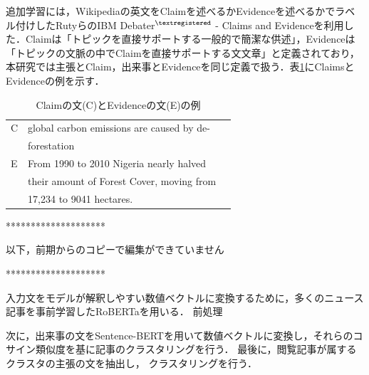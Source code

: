 \documentclass[a4paper, twocolumn, 10pt]{jarticle}
\begin{document}
追加学習には，Wikipediaの英文をClaimを述べるかEvidenceを述べるかでラベル付けしたRutyらのIBM Debater$^{\textregistered}$ - Claims and Evidenceを利用した\cite{rinott_show_2015}．Claimは「トピックを直接サポートする一般的で簡潔な供述」，Evidenceは「トピックの文脈の中でClaimを直接サポートする文文章」と定義されており，本研究では主張とClaim，出来事とEvidenceを同じ定義で扱う．表\ref{claim_evidence_example}にClaimsとEvidenceの例を示す．

\begin{table}[h]
  \caption{Claimの文(C)とEvidenceの文(E)の例}
  \centering
  \begin{tabular}{llp{6cm}}
    \hline
    C & global carbon emissions are caused by de-
    \\
    & forestation
    \\
    E & From 1990 to 2010 Nigeria nearly halved
    \\
    & their amount of Forest Cover, moving from
    \\
    & 17,234 to 9041 hectares.
    \\
    \hline
  \end{tabular}
  \label{claim_evidence_example}
\end{table}

********************

以下，前期からのコピーで編集ができていません

********************


入力文をモデルが解釈しやすい数値ベクトルに変換するために，多くのニュース記事を事前学習したRoBERTaを用いる．
前処理


次に，出来事の文をSentence-BERTを用いて数値ベクトルに変換し，それらのコサイン類似度を基に記事のクラスタリングを行う．
最後に，閲覧記事が属するクラスタの主張の文を抽出し，
クラスタリングを行う．
\end{document}
